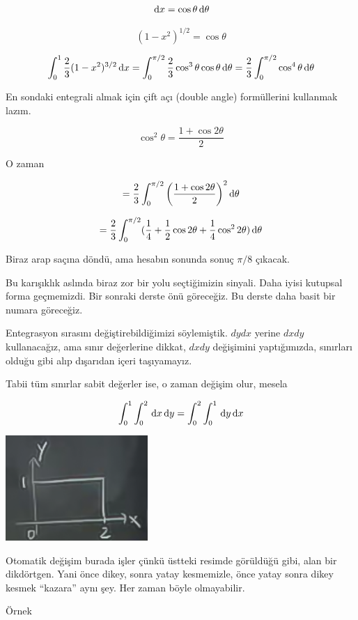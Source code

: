 \documentclass[12pt,fleqn]{article}\usepackage{../../common}
\begin{document}
$$ \,\mathrm{d} x = \cos\theta \,\mathrm{d}\theta$$

$$ (1-x^2)^{1/2} = \cos\theta $$

$$ 
\int_0^1 \frac{2}{3} (1-x^2)^{3/2} \,\mathrm{d} x = 
\int_0^{\pi/2} \frac{2}{3} \cos^3\theta \cos\theta \,\mathrm{d} \theta = 
\frac{2}{3} \int_0^{\pi/2} \cos^4\theta \,\mathrm{d}\theta
$$

En sondaki entegrali almak için çift açı (double angle) formüllerini
kullanmak lazım. 

$$ \cos^2\theta = \frac{1 + \cos 2\theta}{2} $$

O zaman 

$$ = 
\frac{2}{3} \int_0^{\pi/2} 
\bigg( \frac{1 + \cos 2\theta}{2} \bigg)^2 \,\mathrm{d}\theta 
$$

$$
= \frac{2}{3} \int_0^{\pi/2} (
\frac{1}{4} +  \frac{1}{2}\cos2\theta + 
\frac{1}{4}\cos^22\theta) \,\mathrm{d}\theta
$$

Biraz arap saçına döndü, ama hesabın sonunda sonuç $\pi/8$ çıkacak. 

Bu karışıklık aslında biraz zor bir yolu seçtiğimizin sinyali. Daha iyisi
kutupsal forma geçmemizdi. Bir sonraki derste önü göreceğiz. Bu derste daha
basit bir numara göreceğiz.

Entegrasyon sırasını değiştirebildiğimizi söylemiştik. $dy dx$ yerine $dx dy$
kullanacağız, ama sınır değerlerine dikkat, $dx dy$ değişimini yaptığımızda,
sınırları olduğu gibi alıp dışarıdan içeri taşıyamayız.

Tabii tüm sınırlar sabit değerler ise, o zaman değişim olur, mesela

$$
\int_0^1 \int_0^2 \,\mathrm{d} x \,\mathrm{d} y = \int_0^2 \int_0^1 \,\mathrm{d} y \,\mathrm{d} x
$$

\begin{center}
\includegraphics[height=4cm]{16_12.png}
\end{center}

Otomatik değişim burada işler çünkü üstteki resimde görüldüğü gibi, alan bir
dikdörtgen. Yani önce dikey, sonra yatay kesmemizle, önce yatay sonra dikey
kesmek ``kazara'' aynı şey. Her zaman böyle olmayabilir.

Örnek 
\end{document}
